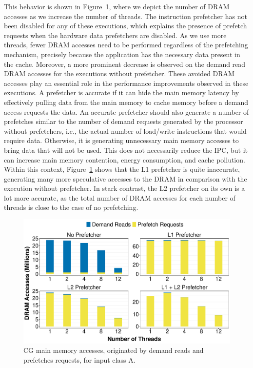 \documentclass[AMA,final,STIX1COL]{WileyNJD-v2}
\begin{document}
This behavior is shown in Figure~\ref{fig:drampapi}, where we depict the number of DRAM accesses as we increase the number of threads.
The instruction prefetcher has not been disabled for any of these executions, which explains the presence of prefetch requests when the hardware data prefetchers are disabled.
As we use more threads, fewer DRAM accesses need to be performed regardless of the prefetching mechanism, precisely because the application has the necessary data present in the cache.
Moreover, a more prominent decrease is observed on the demand read DRAM accesses for the executions without prefetcher.
These avoided DRAM accesses play an essential role in the performance improvements observed in these executions.
A prefetcher is accurate if it can hide the main memory latency by effectively pulling data from the main memory to cache memory before a demand access requests the data.
An accurate prefetcher should also generate a number of prefetches similar to the number of demand requests generated by the processor without prefetchers, i.e., the actual number of load/write instructions that would require data.
Otherwise, it is generating unnecessary main memory accesses to bring data that will not be used.
This does not necessarily reduce the IPC, but it can increase main memory contention, energy consumption, and cache pollution.
Within this context, Figure~\ref{fig:drampapi} shows that the L1 prefetcher is quite inaccurate, generating many more speculative accesses to the DRAM in comparison with the execution without prefetcher. 
In stark contrast, the L2 prefetcher on its own is a lot more accurate, as the total number of DRAM accesses for each number of threads is close to the case of no prefetching. 

\begin{figure}[!htb]
    \centering
    \includegraphics[width=.8\linewidth]{figures/fig4.pdf}
    \caption{CG main memory accesses, originated by demand reads and prefetches requests, for input class A.}
    \label{fig:drampapi}
\end{figure}
\end{document}
